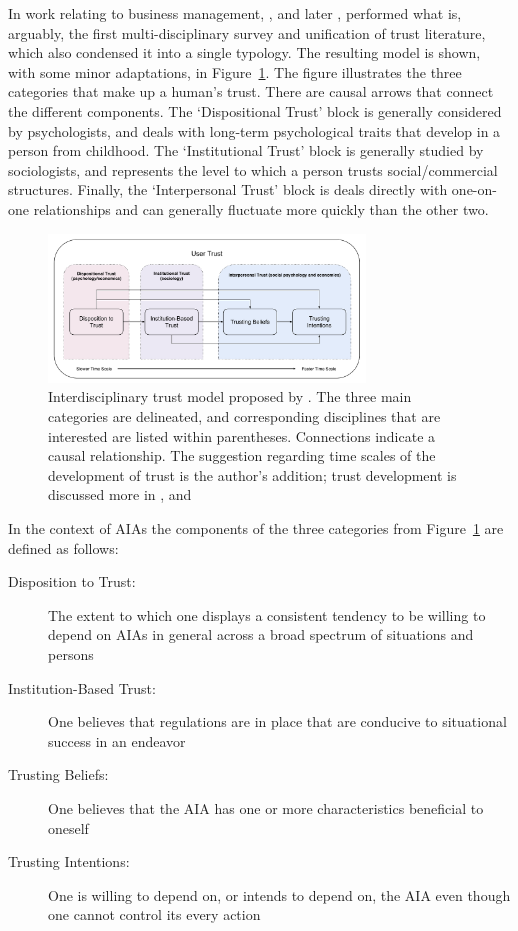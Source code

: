         In work relating to business management, \citet{McKnight1998-ty}, and later \citet{McKnight2001-fa}, performed what is, arguably, the first multi-disciplinary survey and unification of trust literature, which also condensed it into a single typology. The resulting model is shown, with some minor adaptations, in Figure~\ref{fig:UserTrust}. The figure illustrates the three categories that make up a human's trust. There are causal arrows that connect the different components. The `Dispositional Trust' block is generally considered by psychologists, and deals with long-term psychological traits that develop in a person from childhood. The `Institutional Trust' block is generally studied by sociologists, and represents the level to which a person trusts social/commercial structures. Finally, the `Interpersonal Trust' block is deals directly with one-on-one relationships and can generally fluctuate more quickly than the other two.

        \begin{figure}[htbp]
            \centering
            \includegraphics[width=0.75\textwidth]{Figures/UserTrust}
            \caption{Interdisciplinary trust model proposed by \citet{McKnight2001-fa}. The three main categories are delineated, and corresponding disciplines that are interested are listed within parentheses. Connections indicate a causal relationship. The suggestion regarding time scales of the development of trust is the author's addition; trust development is discussed more in \cite{Lewicki2006-gp}, and \cite{Lewicki2006-hj}}
            \label{fig:UserTrust}
        \end{figure}

        In the context of AIAs the components of the three categories from Figure~\ref{fig:UserTrust} are defined as follows:

        \begin{description}
            \item [Disposition to Trust:] The extent to which one displays a consistent tendency to be willing to depend on AIAs in general across a broad spectrum of situations and persons
            \item [Institution-Based Trust:] One believes that regulations are in place that are conducive to situational success in an endeavor
            \item [Trusting Beliefs:] One believes that the AIA has one or more characteristics beneficial to oneself
            \item [Trusting Intentions:] One is willing to depend on, or intends to depend on, the AIA even though one cannot control its every action
        \end{description}

